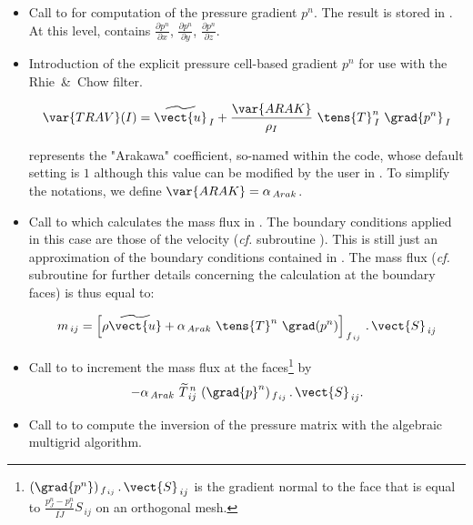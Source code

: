 \begin{itemize}

\item Call to  for computation of the pressure gradient $p^n$. The result is stored in . At this level,  contains $\displaystyle \frac{\partial p^n}{\partial x}$, $\displaystyle \frac{\partial p^n}{\partial y}$, $\displaystyle \frac{\partial p^n}{\partial z}$.

\item Introduction of the explicit pressure cell-based gradient $p^n$ for use with the Rhie~\&~Chow filter.

$$ \var{TRAV}(I) = \widetilde{\vect{u}}_{\,I} + \frac{\var{ARAK}}{\rho_I} \ \tens{T}^n_{\,I}\ \grad{p^n}_{\,I}$$

 represents the "Arakawa" coefficient, so-named within the code, whose default setting is $1$ although this value can be modified by the user in . To simplify the notations, we define $\var{ARAK} = \alpha_{\,Arak}$.

\item Call to  which calculates the mass flux in . The boundary conditions applied in this case are those of the velocity (\textit{cf.} subroutine ). This is still just an approximation of the boundary conditions contained in . The mass flux (\textit{cf.} subroutine  for further details concerning the calculation at the boundary faces) is thus equal to:

$$m_{\,ij} = \left[\rho \widetilde{\vect{u}}+ \displaystyle \alpha_{\,Arak}\ \tens{T}^n\ \grad(p^n)\right]_{\,f_{\,ij}}\,.\,\vect{S}_{\,ij}$$

\item Call to  to increment the mass flux at the faces\footnote{$(\grad{p^n})_{\,f_{\,ij}}\,.\,\vect{S}_{\,ij}$ is the gradient normal to the face that is equal to  $\displaystyle \frac{ p^n_J - p^n_I}{\overline{IJ}} S_{\,ij}$ on an orthogonal mesh.} by $$- \alpha_{\,Arak}\  \widetilde{T}^{\,n}_{\,ij}\ (\grad{p}^n)_{\,f_{\,ij}}\,.\,\vect{S}_{\,ij}.$$

\item Call to  to compute the inversion of the pressure matrix with the algebraic multigrid algorithm.


\end{itemize}

